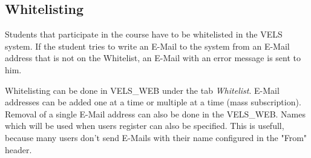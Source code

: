\subsection{Whitelisting} \label{sub:whitelisting}
Students that participate in the course have to be whitelisted in the VELS system. If the student
tries to write an E-Mail to the system from an E-Mail address that is not on the Whitelist, an E-Mail
with an error message is sent to him.

Whitelisting can be done in VELS\_WEB under the tab {\it Whitelist}. E-Mail addresses can be added
one at a time or multiple at a time (mass subscription). Removal of a single E-Mail address
can also be done in the VELS\_WEB. Names which will be used when users register can also be 
specified. This is usefull, because many users don't send E-Mails with their name configured
in the "From" header.

